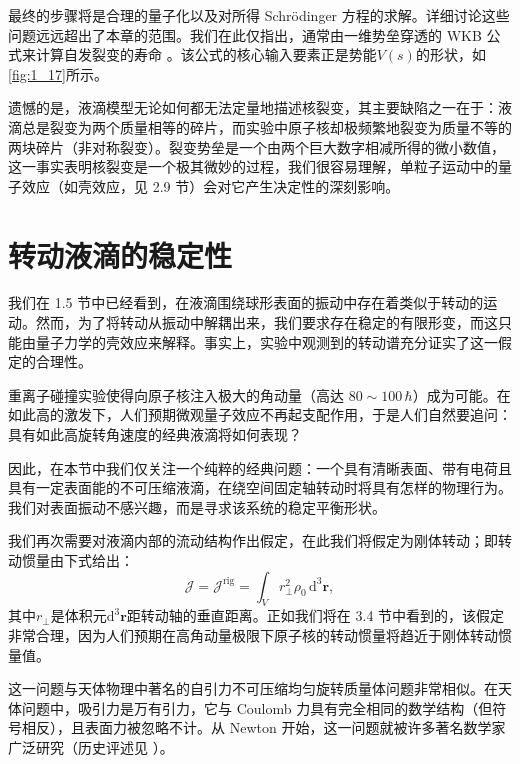 最终的步骤将是合理的量子化以及对所得 Schrödinger 方程的求解。详细讨论这些问题远远超出了本章的范围。我们在此仅指出，通常由一维势垒穿透的
WKB 公式来计算自发裂变的寿命 \cite{Wi64}。该公式的核心输入要素正是势能$V(s)$的形状，如\ref{fig:1_17}所示。

遗憾的是，液滴模型无论如何都无法定量地描述核裂变，其主要缺陷之一在于：液滴总是裂变为两个质量相等的碎片，而实验中原子核却极频繁地裂变为质量不等的两块碎片（非对称裂变）。裂变势垒是一个由两个巨大数字相减所得的微小数值，这一事实表明核裂变是一个极其微妙的过程，我们很容易理解，单粒子运动中的量子效应（如壳效应，见
2.9 节）会对它产生决定性的深刻影响。

\section{转动液滴的稳定性\label{sec:=008F6C=0052A8=006DB2=006EF4=007684=007A33=005B9A=006027}}

我们在 1.5 节中已经看到，在液滴围绕球形表面的振动中存在着类似于转动的运动。然而，为了将转动从振动中解耦出来，我们要求存在稳定的有限形变，而这只能由量子力学的壳效应来解释。事实上，实验中观测到的转动谱充分证实了这一假定的合理性。

重离子碰撞实验使得向原子核注入极大的角动量（高达 $80\sim100\,\hbar$）成为可能。在如此高的激发下，人们预期微观量子效应不再起支配作用，于是人们自然要追问：具有如此高旋转角速度的经典液滴将如何表现？

因此，在本节中我们仅关注一个纯粹的经典问题：一个具有清晰表面、带有电荷且具有一定表面能的不可压缩液滴，在绕空间固定轴转动时将具有怎样的物理行为。我们对表面振动不感兴趣，而是寻求该系统的稳定平衡形状。

我们再次需要对液滴内部的流动结构作出假定，在此我们将假定为刚体转动；即转动惯量由下式给出：
\begin{equation}
\mathcal{J}=\mathcal{J}^{\text{rig}}=\int_{V}r^{2}_{\perp}\rho_{0}\,\mathrm{d}^{3}\boldsymbol{r},\label{eq:1.84}
\end{equation}
其中$r_{\perp}$是体积元$\mathrm{d}^{3}\boldsymbol{r}$距转动轴的垂直距离。正如我们将在
3.4 节中看到的，该假定非常合理，因为人们预期在高角动量极限下原子核的转动惯量将趋近于刚体转动惯量值。

这一问题与天体物理中著名的自引力不可压缩均匀旋转质量体问题非常相似。在天体问题中，吸引力是万有引力，它与 Coulomb 力具有完全相同的数学结构（但符号相反），且表面力被忽略不计。从
Newton 开始，这一问题就被许多著名数学家广泛研究（历史评述见 \cite[第 1 章]{Ch69}）。

